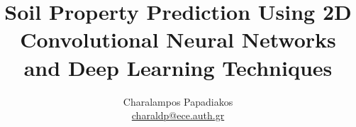 \documentclass[a4paper,12pt]{report}
\def\tl{\textlatin}
\begin{document}
\pgfplotsset{compat=1.16}


\title{\tl{Soil Property Prediction Using 2D Convolutional Neural Networks and Deep Learning Techniques}}
\author{\tl{Charalampos Papadiakos} \\
\href{mailto:charaldp@ece.auth.gr}{\tl{charaldp@ece.auth.gr}}}
\maketitle

\tableofcontents
\listoffigures
\listoftables








\appendix





\end{document}
